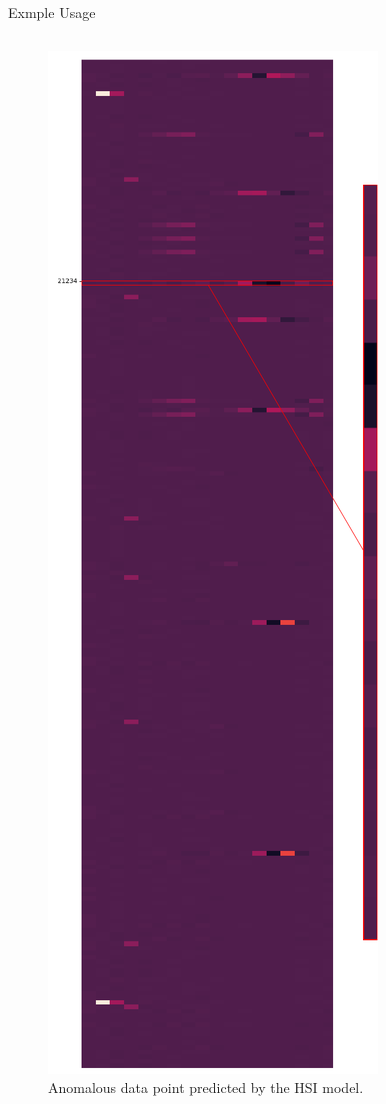 \begin{frame}{Exmple Usage}
\begin{columns}
\begin{column}{.33\textwidth}
\begin{figure}
                \includegraphics[height=.7\textheight]{../Images/model_pipeline_tikz/CyberPred/anomaly_raw_data.pdf} 
            \caption{Anomalous data point predicted by the HSI model. }       
            \end{figure}
            \ec
        \end{column}
    \end{columns}
\end{frame}
